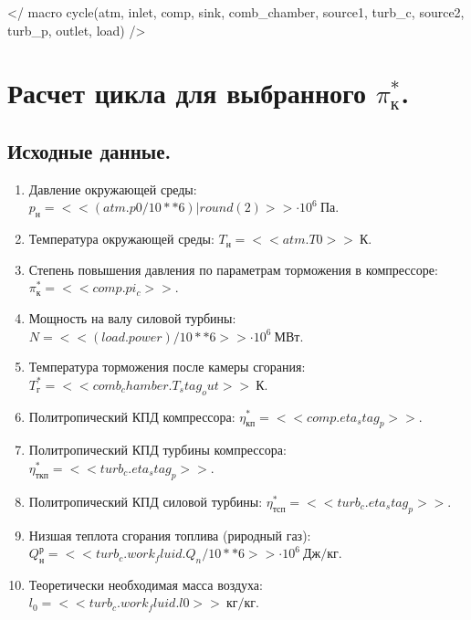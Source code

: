 ﻿</ macro cycle(atm, inlet, comp, sink, comb_chamber, source1, turb_c, source2, turb_p, outlet, load)  />


\section{Расчет цикла для выбранного $\pi_к^*$.}

\subsection{Исходные данные.}

\begin{enumerate}

	\item Давление окружающей среды: $p_{н} = << (atm.p0 / 10**6)|round(2) >> \cdot 10^6\ Па$.
	\item Температура окружающей среды: $T_{н} = << atm.T0 >>\ К$.
	\item Степень повышения давления по параметрам торможения в компрессоре: $\pi_к^*= << comp.pi_c >>$.
	\item Мощность на валу силовой турбины: $ N = << (load.power)/ 10**6 >> \cdot 10^6\ МВт $.
	\item Температура торможения после камеры сгорания: $T_г^* = << comb_chamber.T_stag_out >>\ К$.
	\item Политропический КПД компрессора: $\eta^*_{к п} = << comp.eta_stag_p >> $.
	\item Политропический КПД турбины компрессора: $\eta^*_{ткп} = << turb_c.eta_stag_p >>$.
	\item Политропический КПД силовой турбины: $\eta^*_{тсп} = << turb_c.eta_stag_p >>$.
	\item Низшая теплота сгорания топлива (риродный газ): $Q^р_н = << turb_c.work_fluid.Q_n / 10**6>> \cdot 10^6\ Дж/кг$.
	\item Теоретически необходимая масса воздуха: $l_0 = << turb_c.work_fluid.l0 >>\ кг/кг$.


\end{enumerate}

